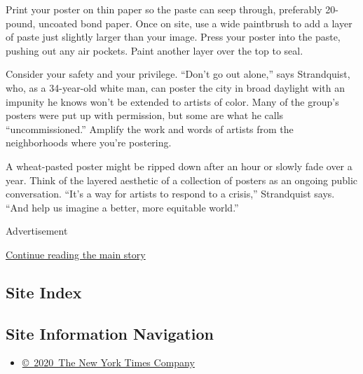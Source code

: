 Print your poster on thin paper so the paste can seep through,
preferably 20-pound, uncoated bond paper. Once on site, use a wide
paintbrush to add a layer of paste just slightly larger than your image.
Press your poster into the paste, pushing out any air pockets. Paint
another layer over the top to seal.

Consider your safety and your privilege. ``Don't go out alone,'' says
Strandquist, who, as a 34-year-old white man, can poster the city in
broad daylight with an impunity he knows won't be extended to artists of
color. Many of the group's posters were put up with permission, but some
are what he calls ``uncommissioned.'' Amplify the work and words of
artists from the neighborhoods where you're postering.

A wheat-pasted poster might be ripped down after an hour or slowly fade
over a year. Think of the layered aesthetic of a collection of posters
as an ongoing public conversation. ``It's a way for artists to respond
to a crisis,'' Strandquist says. ``And help us imagine a better, more
equitable world.''

Advertisement

\protect\hyperlink{after-bottom}{Continue reading the main story}

\hypertarget{site-index}{%
\subsection{Site Index}\label{site-index}}

\hypertarget{site-information-navigation}{%
\subsection{Site Information
Navigation}\label{site-information-navigation}}

\begin{itemize}
\tightlist
\item
  \href{https://help.nytimes3xbfgragh.onion/hc/en-us/articles/115014792127-Copyright-notice}{©~2020~The
  New York Times Company}
\end{itemize}

